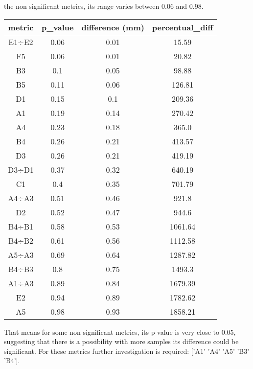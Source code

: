 \newpageFor the non significant metrics, its range varies between 0.06 and 0.98.
 \begin{table}[H]
\centering
\begin{tabular}{|c|c|c|c|}
\hline
metric & p\_value & difference (mm) & percentual\_diff \\ 
\hline
E1÷E2 & 0.06 & 0.01 & 15.59 \\ 
F5 & 0.06 & 0.01 & 20.82 \\ 
B3 & 0.1 & 0.05 & 98.88 \\ 
B5 & 0.11 & 0.06 & 126.81 \\ 
D1 & 0.15 & 0.1 & 209.36 \\ 
A1 & 0.19 & 0.14 & 270.42 \\ 
A4 & 0.23 & 0.18 & 365.0 \\ 
B4 & 0.26 & 0.21 & 413.57 \\ 
D3 & 0.26 & 0.21 & 419.19 \\ 
D3÷D1 & 0.37 & 0.32 & 640.19 \\ 
C1 & 0.4 & 0.35 & 701.79 \\ 
A4÷A3 & 0.51 & 0.46 & 921.8 \\ 
D2 & 0.52 & 0.47 & 944.6 \\ 
B4÷B1 & 0.58 & 0.53 & 1061.64 \\ 
B4÷B2 & 0.61 & 0.56 & 1112.58 \\ 
A5÷A3 & 0.69 & 0.64 & 1287.82 \\ 
B4÷B3 & 0.8 & 0.75 & 1493.3 \\ 
A1÷A3 & 0.89 & 0.84 & 1679.39 \\ 
E2 & 0.94 & 0.89 & 1782.62 \\ 
A5 & 0.98 & 0.93 & 1858.21 \\ 
\hline
\end{tabular}
\end{table}
That means for some non significant metrics, its p value is very close to 0.05, suggesting that there is a possibility with
    more samples its difference could be significant. For these metrics further investigation is required: ['A1' 'A4' 'A5' 'B3' 'B4'].

    